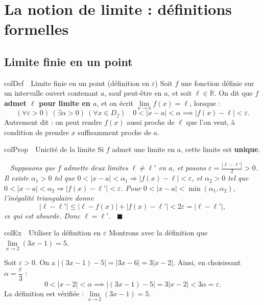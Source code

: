 \documentclass[11pt,a4paper]{article}
\newenvironment{definition}[1][Définition]
  {\begin{fiche}{colDef}{\ding{110}~~#1}}{\end{fiche}}
\newenvironment{propriete}[1][Propriété]
  {\begin{fiche}{colProp}{\ding{72}~~#1}}{\end{fiche}}
\newenvironment{exemple}[1][Exemple]
  {\begin{fiche}{colEx}{\ding{217}~~#1}}{\end{fiche}}
\newenvironment{demo}
  {\par\smallskip\noindent{\sffamily\bfseries\color{qtealdark}Démonstration.}\ \itshape}
  {\ \normalfont\hfill$\blacksquare$\par\medskip}
\begin{document}
\vspace{4mm}

\section{La notion de limite : définitions formelles}

\subsection{Limite finie en un point}

\begin{definition}[Limite finie en un point (définition en $\varepsilon$)]
Soit $f$ une fonction définie sur un intervalle ouvert contenant $a$, sauf peut-être en $a$, et soit $\ell \in \mathbb{R}$. On dit que $f$ \textbf{admet $\ell$ pour limite en $a$}, et on écrit $\lim\limits_{x \to a} f(x) = \ell$, lorsque :
\[
  (\forall \varepsilon > 0)\ (\exists \alpha > 0)\ (\forall x \in D_f)\quad
  0 < |x - a| < \alpha \implies |f(x) - \ell| < \varepsilon.
\]
Autrement dit : on peut rendre $f(x)$ aussi proche de $\ell$ que l'on veut, à condition de prendre $x$ suffisamment proche de $a$.
\end{definition}

\begin{propriete}[Unicité de la limite]
Si $f$ admet une limite en $a$, cette limite est \textbf{unique}.
\end{propriete}

\begin{demo}
Supposons que $f$ admette deux limites $\ell \neq \ell'$ en $a$, et posons $\varepsilon = \frac{|\ell - \ell'|}{2} > 0$. Il existe $\alpha_1 > 0$ tel que $0 < |x - a| < \alpha_1 \Rightarrow |f(x) - \ell| < \varepsilon$, et $\alpha_2 > 0$ tel que $0 < |x - a| < \alpha_2 \Rightarrow |f(x) - \ell'| < \varepsilon$. Pour $0 < |x - a| < \min(\alpha_1, \alpha_2)$, l'inégalité triangulaire donne
\[
  |\ell - \ell'| \leq |\ell - f(x)| + |f(x) - \ell'| < 2\varepsilon = |\ell - \ell'|,
\]
ce qui est absurde. Donc $\ell = \ell'$.
\end{demo}

\begin{exemple}[Utiliser la définition en $\varepsilon$]
Montrons avec la définition que $\lim\limits_{x \to 2} (3x - 1) = 5$.

\smallskip
Soit $\varepsilon > 0$. On a $|(3x - 1) - 5| = |3x - 6| = 3|x - 2|$. Ainsi, en choisissant $\alpha = \dfrac{\varepsilon}{3}$ :
\[
  0 < |x - 2| < \alpha \implies |(3x - 1) - 5| = 3|x - 2| < 3\alpha = \varepsilon.
\]
La définition est vérifiée : $\lim\limits_{x \to 2}(3x - 1) = 5$.
\end{exemple}
\end{document}
